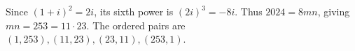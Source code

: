 Since $(1+i)^2=2i$, its sixth power is $(2i)^3=\boxed{-8i}$. Thus $2024=8mn$, giving $mn=253=11\cdot23$. The ordered pairs are $\boxed{(1,253),(11,23),(23,11),(253,1)}$.
